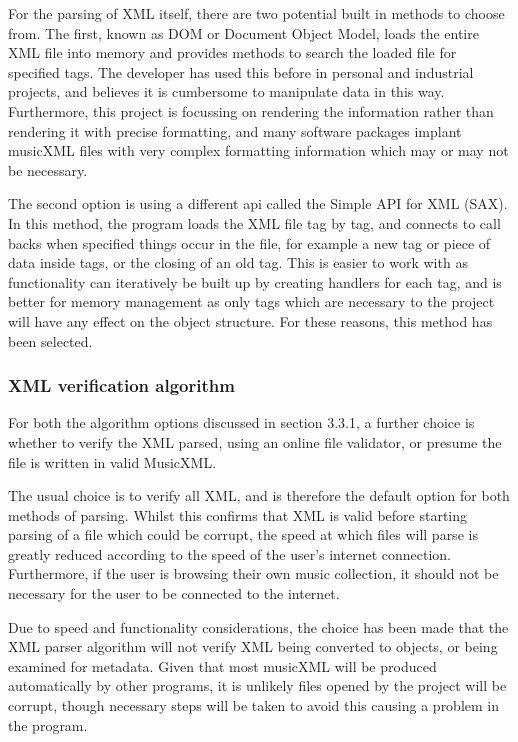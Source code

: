 For the parsing of XML itself, there are two potential built in methods to choose from. The first, known as DOM or Document Object Model, loads the entire XML file into memory and provides methods to search the loaded file for specified tags. The developer has used this before in personal and industrial projects, and believes it is cumbersome to manipulate data in this way. Furthermore, this project is focussing on rendering the information rather than rendering it with precise formatting, and many software packages implant musicXML files with very complex formatting information which may or may not be necessary.

The second option is using a different api called the Simple API for XML (SAX). In this method, the program loads the XML file tag by tag, and connects to call backs when specified things occur in the file, for example a new tag or piece of data inside tags, or the closing of an old tag. This is easier to work with as functionality can iteratively be built up by creating handlers for each tag, and is better for memory management as only tags which are necessary to the project will have any effect on the object structure. For these reasons, this method has been selected.

\subsubsection{XML verification algorithm}
For both the algorithm options discussed in section 3.3.1, a further choice is whether to verify the XML parsed, using an online file validator, or presume the file is written in valid MusicXML. 

The usual choice is to verify all XML, and is therefore the default option for both methods of parsing. Whilst this confirms that XML is valid before starting parsing of a file which could be corrupt, the speed at which files will parse is greatly reduced according to the speed of the user's internet connection.
Furthermore, if the user is browsing their own music collection, it should not be necessary for the user to be connected to the internet.

Due to speed and functionality considerations, the choice has been made that the XML parser algorithm will not verify XML being converted to objects, or being examined for metadata. Given that most musicXML will be produced automatically by other programs, it is unlikely files opened by the project will be corrupt, though necessary steps will be taken to avoid this causing a problem in the program.

